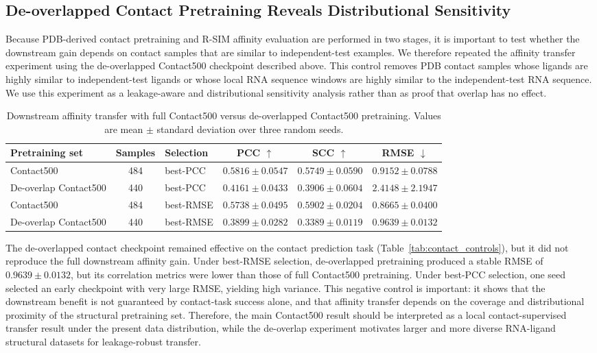 \documentclass[journal=jcisd8,manuscript=article]{achemso}
\begin{document}
\subsection{De-overlapped Contact Pretraining Reveals Distributional Sensitivity}

Because PDB-derived contact pretraining and R-SIM affinity evaluation are performed in two stages, it is important to test whether the downstream gain depends on contact samples that are similar to independent-test examples. We therefore repeated the affinity transfer experiment using the de-overlapped Contact500 checkpoint described above. This control removes PDB contact samples whose ligands are highly similar to independent-test ligands or whose local RNA sequence windows are highly similar to the independent-test RNA sequence. We use this experiment as a leakage-aware and distributional sensitivity analysis rather than as proof that overlap has no effect.

\begin{table}[t]
\centering
\caption{Downstream affinity transfer with full Contact500 versus de-overlapped Contact500 pretraining. Values are mean $\pm$ standard deviation over three random seeds.}
\label{tab:deoverlap_affinity}
\small
\setlength{\tabcolsep}{3pt}
\begin{tabular}{lclccc}
\toprule
Pretraining set & Samples & Selection & PCC $\uparrow$ & SCC $\uparrow$ & RMSE $\downarrow$ \\
\midrule
Contact500 & 484 & best-PCC & $0.5816 \pm 0.0547$ & $0.5749 \pm 0.0590$ & $0.9152 \pm 0.0788$ \\
De-overlap Contact500 & 440 & best-PCC & $0.4161 \pm 0.0433$ & $0.3906 \pm 0.0604$ & $2.4148 \pm 2.1947$ \\
Contact500 & 484 & best-RMSE & $0.5738 \pm 0.0495$ & $0.5902 \pm 0.0204$ & $0.8665 \pm 0.0400$ \\
De-overlap Contact500 & 440 & best-RMSE & $0.3899 \pm 0.0282$ & $0.3389 \pm 0.0119$ & $0.9639 \pm 0.0132$ \\
\bottomrule
\end{tabular}
\end{table}

The de-overlapped contact checkpoint remained effective on the contact prediction task (Table~\ref{tab:contact_controls}), but it did not reproduce the full downstream affinity gain. Under best-RMSE selection, de-overlapped pretraining produced a stable RMSE of $0.9639 \pm 0.0132$, but its correlation metrics were lower than those of full Contact500 pretraining. Under best-PCC selection, one seed selected an early checkpoint with very large RMSE, yielding high variance. This negative control is important: it shows that the downstream benefit is not guaranteed by contact-task success alone, and that affinity transfer depends on the coverage and distributional proximity of the structural pretraining set. Therefore, the main Contact500 result should be interpreted as a local contact-supervised transfer result under the present data distribution, while the de-overlap experiment motivates larger and more diverse RNA-ligand structural datasets for leakage-robust transfer.
\end{document}
